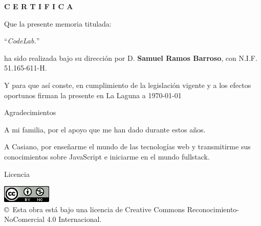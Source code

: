 \documentclass[spanish,a4paper,14pt,oneside]{extreport}
\begin{document}
\bigskip
\bigskip
{\bf C E R T I F I C A}

\bigskip
\bigskip
\bigskip
Que la presente memoria titulada:

\bigskip
``{\it CodeLab.}''

\bigskip
\bigskip
\bigskip

\noindent ha sido realizada bajo su dirección por D. {\bf Samuel Ramos Barroso},
con N.I.F. 51.165-611-H.

\bigskip
\bigskip

Y para que así conste, en cumplimiento de la legislación vigente y a los efectos oportunos firman la presente en La Laguna a \today

\newpage
\thispagestyle{empty}

{ \flushright

\begin{LARGE}
Agradecimientos
\end{LARGE}

\hspace{3mm}

\begin{large}

\hspace{3mm}
A mi familia, por el apoyo que me han dado durante estos años.

\hspace{3mm}
A Casiano, por enseñarme el mundo de las tecnologías web y transmitirme sus conocimientos sobre JavaScript e iniciarme en el mundo fullstack.

\end{large}

}

\newpage

\begin{huge}
Licencia
\end{huge}

\begin{center}
\includegraphics[scale=1.5]{images/by-nc_88x31}\\[10mm]
{\Large \copyright~Esta obra está bajo una licencia de Creative Commons Reconocimiento-NoComercial 4.0 Internacional.
}
\end{center}
\end{document}
